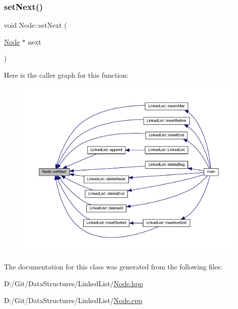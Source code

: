 \mbox{\label{class_node_a89b12aca90acdf6a8a547cbdab9b80a5}} 
\subsubsection{\texorpdfstring{set\+Next()}{setNext()}}
{\footnotesize\ttfamily void Node\+::set\+Next (\begin{DoxyParamCaption}\item[{\hyperlink{class_node}{Node} $\ast$}]{next }\end{DoxyParamCaption})}

Here is the caller graph for this function\+:
\nopagebreak
\begin{figure}[H]
\begin{center}
\leavevmode
\includegraphics[width=350pt]{class_node_a89b12aca90acdf6a8a547cbdab9b80a5_icgraph}
\end{center}
\end{figure}


The documentation for this class was generated from the following files\+:\begin{DoxyCompactItemize}
\item 
D\+:/\+Git/\+Data\+Structures/\+Linked\+List/\hyperlink{_node_8hpp}{Node.\+hpp}\item 
D\+:/\+Git/\+Data\+Structures/\+Linked\+List/\hyperlink{_node_8cpp}{Node.\+cpp}\end{DoxyCompactItemize}

